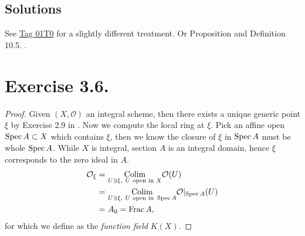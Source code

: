 \begin{comment}
    For the first condition. Suppose $V=\Spec B$ has the property. Then we wish to check $\Spec B_g$ has the property for any $g\in B$. We know $f^{-1}(V)$ can be covered by $U_j=\Spec A_j$ where $A_j$ is f.g. $B$-algebra. Therefore 
    \[f^{-1}(\Spec B_g)=\bigcup U_j\cap f^{-1}(\Spec B_g).\]For each $U_j\cap f^{-1}(\Spec B_g)$, by the virtue of 5.3.1. Proposition of Rising Sea \cite{RaviRisingSea}, it could be covered by distinguished open subsets $D_{U_j}(a_{\bullet})$ for some $a_{\bullet}\in A_j$ (here $f^{-1}(\Spec B_g)$ is open, hence admits a covering by open affine subsets. Pick one of such open affine and intersection with open affine subset $U_j$). And all such distinguished open subsets can indeed cover $f^{-1}(\Spec B_g)$. 

    The global section of any such distinguished open is a localisation of $A_i$ at one element $a_{\bullet}$. While $A_i$ is assumed to be f.g. $B$-algebra, hence we know $\{1,a_{\bullet},...\}^{-1}A_i$ 

    I lost information about g, ???
\end{comment}

\subsection{Solutions}

See \href{https://stacks.math.columbia.edu/tag/01T0}{Tag 01T0} for a slightly different treatment. Or Proposition and Definition 10.5. \cite{gortz2020algebraic}.

\section{Exercise 3.6.}

\begin{proof}
Given $(X,\mathcal O)$ an integral scheme, then there exists a unique generic point $\xi$ by Exercise 2.9 in . Now we compute the local ring at $\xi$. Pick an affine open $\operatorname{Spec} A\subset X$ which contains $\xi$, then we know the closure of $\xi$ in $\operatorname{Spec} A$ must be whole $\operatorname{Spec} A$. While $X$ is integral, section $A$ is an integral domain, hence $\xi$ corresponds to the zero ideal in $A$.
\begin{align*}
    \mathcal O_{\xi} =&~ \underset{U \ni \xi,~ U \text{ open in } X}{\operatorname{Colim}} \mathcal O(U)\\
    =&~ \underset{U \ni \xi,~ U \text{ open in } \operatorname{Spec} A}{\operatorname{Colim}} \mathcal O\vert_{\operatorname{Spec} A}(U)\\ 
    =&~ A_{0}=\operatorname{Frac} A,
\end{align*} for which we define as the \textit{function field} $K(X)$.

\end{proof}

